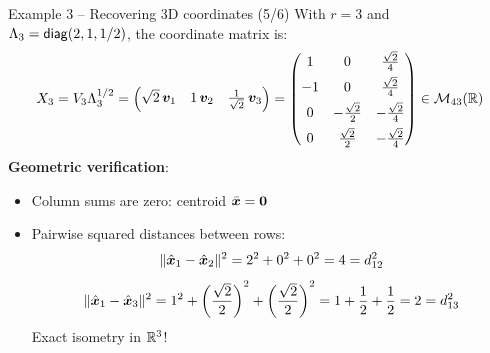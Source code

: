 \documentclass[aspectratio=169]{beamer}\usepackage[]{graphicx}\usepackage[]{xcolor}
\begin{document}
\begin{frame}{Example 3 -- Recovering 3D coordinates (5/6)}
With $r = 3$ and $\Lambda_3 = \mathsf{diag}(2, 1, 1/2)$, the coordinate matrix is:
\[
X_3 = V_3 \Lambda_3^{1/2} = \begin{pmatrix} \sqrt{2}\,\bm{v}_1 & 1\,\bm{v}_2 & \frac{1}{\sqrt{2}}\,\bm{v}_3 \end{pmatrix}
= \begin{pmatrix}
1 & 0 & \frac{\sqrt{2}}{4} \\[0.15cm]
-1 & 0 & \frac{\sqrt{2}}{4} \\[0.15cm]
0 & -\frac{\sqrt{2}}{2} & -\frac{\sqrt{2}}{4} \\[0.15cm]
0 & \frac{\sqrt{2}}{2} & -\frac{\sqrt{2}}{4}
\end{pmatrix} \in \mathcal{M}_{43}(\mathbb{R})
\]
\vfill
\textbf{Geometric verification}:
\begin{itemize}
\item Column sums are zero: centroid $\bar{\bx} = \b0$
\item Pairwise squared distances between rows:
\[
\|\hat{\bm{x}}_1 - \hat{\bm{x}}_2\|^2 = 2^2 + 0^2 + 0^2 = 4 = d_{12}^2
\]
\[
\|\hat{\bm{x}}_1 - \hat{\bm{x}}_3\|^2 = 1^2 + \left(\frac{\sqrt{2}}{2}\right)^2 + \left(\frac{\sqrt{2}}{2}\right)^2 = 1 + \frac{1}{2} + \frac{1}{2} = 2 = d_{13}^2
\]
Exact isometry in $\mathbb{R}^3$!
\end{itemize}
\end{frame}
\end{document}
